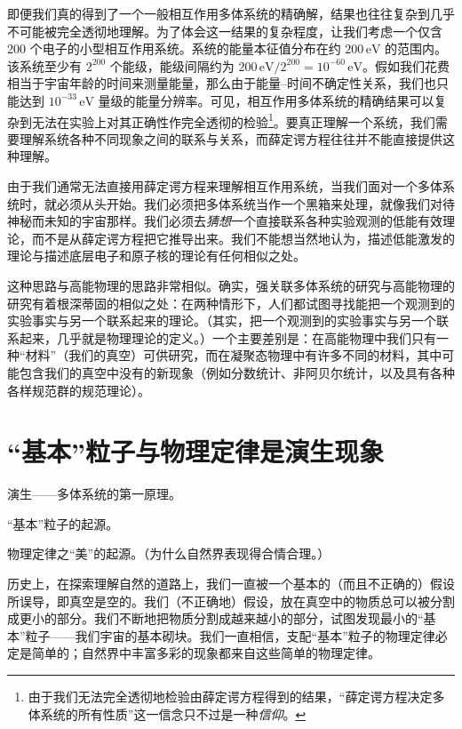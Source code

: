 即便我们真的得到了一个一般相互作用多体系统的精确解，结果也往往复杂到几乎不可能被完全透彻地理解。为了体会这一结果的复杂程度，让我们考虑一个仅含 200 个电子的小型相互作用系统。系统的能量本征值分布在约 $200\,\mathrm{eV}$ 的范围内。该系统至少有 $2^{200}$ 个能级，能级间隔约为 $200\,\mathrm{eV}/2^{200}=10^{-60}\,\mathrm{eV}$。假如我们花费相当于宇宙年龄的时间来测量能量，那么由于能量–时间不确定性关系，我们也只能达到 $10^{-33}\,\mathrm{eV}$ 量级的能量分辨率。可见，相互作用多体系统的精确结果可以复杂到无法在实验上对其正确性作完全透彻的检验\footnote{由于我们无法完全透彻地检验由薛定谔方程得到的结果，“薛定谔方程决定多体系统的所有性质”这一信念只不过是一种\emph{信仰}。}。要真正理解一个系统，我们需要理解系统各种不同现象之间的联系与关系，而薛定谔方程往往并不能直接提供这种理解。

由于我们通常无法直接用薛定谔方程来理解相互作用系统，当我们面对一个多体系统时，就必须从头开始。我们必须把多体系统当作一个黑箱来处理，就像我们对待神秘而未知的宇宙那样。我们必须去\emph{猜想}一个直接联系各种实验观测的低能有效理论，而不是从薛定谔方程把它推导出来。我们不能想当然地认为，描述低能激发的理论与描述底层电子和原子核的理论有任何相似之处。

这种思路与高能物理的思路非常相似。确实，强关联多体系统的研究与高能物理的研究有着根深蒂固的相似之处：在两种情形下，人们都试图寻找能把一个观测到的实验事实与另一个联系起来的理论。（其实，把一个观测到的实验事实与另一个联系起来，几乎就是物理理论的定义。）一个主要差别是：在高能物理中我们只有一种“材料”（我们的真空）可供研究，而在凝聚态物理中有许多不同的材料，其中可能包含我们的真空中没有的新现象（例如分数统计、非阿贝尔统计，以及具有各种各样规范群的规范理论）。

\section{“基本”粒子与物理定律是演生现象}

\begin{keypoints}
\item 演生——多体系统的第一原理。
\item “基本”粒子的起源。
\item 物理定律之“美”的起源。（为什么自然界表现得合情合理。）
\end{keypoints}

历史上，在探索理解自然的道路上，我们一直被一个基本的（而且不正确的）假设所误导，即真空是空的。我们（不正确地）假设，放在真空中的物质总可以被分割成更小的部分。我们不断地把物质分割成越来越小的部分，试图发现最小的“基本”粒子——我们宇宙的基本砌块。我们一直相信，支配“基本”粒子的物理定律必定是简单的；自然界中丰富多彩的现象都来自这些简单的物理定律。

